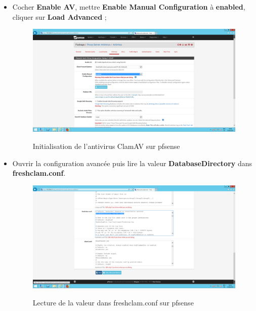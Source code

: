 \begin{itemize}
\item Cocher \textbf{Enable AV}, mettre \textbf{Enable Manual Configuration} à \textbf{enabled}, cliquer sur \textbf{Load Advanced} ;
\begin{figure}[h!]
    \begin{center}
        \includegraphics[scale=0.3]{Pfsense_Screeshots/interception/13.png}
        \label{Pfsense_Screeshots/interception/13}
        \caption{Initialisation de l'antivirus ClamAV sur pfsense}
    \end{center}
\end{figure}
\FloatBarrier 

\item Ouvrir la configuration avancée puis lire la valeur \textbf{DatabaseDirectory} dans \textbf{freshclam.conf}.
\begin{figure}[h!]
    \begin{center}
        \includegraphics[scale=0.23]{Pfsense_Screeshots/interception/14.png}
        \label{Pfsense_Screeshots/interception/14}
        \caption{Lecture de la valeur dans freshclam.conf sur pfsense}
    \end{center}
\end{figure}
\FloatBarrier 

\end{itemize}

